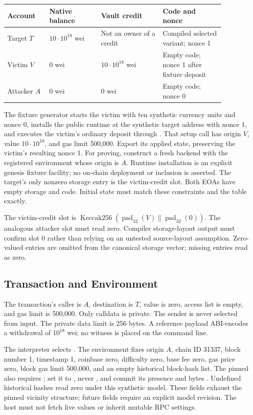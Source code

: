 \documentclass[11pt]{article}
\begin{document}
\begin{longtable}{L{0.17\linewidth}L{0.21\linewidth}L{0.25\linewidth}L{0.25\linewidth}}
\toprule
\textbf{Account} & \textbf{Native balance} & \textbf{Vault credit} & \textbf{Code and nonce} \\
\midrule
\endhead
Target \(T\) & \(10\cdot10^{18}\) wei & Not an owner of a credit & Compiled selected variant; nonce 1 \\
Victim \(V\) & 0 wei & \(10\cdot10^{18}\) wei & Empty code; nonce 1 after fixture deposit \\
Attacker \(A\) & 0 wei & 0 wei & Empty code; nonce 0 \\
\bottomrule
\end{longtable}

The fixture generator starts the victim with ten synthetic currency units and nonce 0, installs the public runtime at the synthetic target address with nonce 1, and executes the victim's ordinary deposit through . That setup call has origin \(V\), value \(10\cdot10^{18}\), and gas limit 500,000. Export its applied state, preserving the victim's resulting nonce 1. For proving, construct a fresh backend with the registered environment whose origin is \(A\). Runtime installation is an explicit genesis fixture facility; no on-chain deployment or inclusion is asserted. The target's only nonzero storage entry is the victim-credit slot. Both EOAs have empty storage and code. Initial state must match these constraints and the table exactly.

The victim-credit slot is \(\operatorname{Keccak256}(\operatorname{pad}_{32}(V)\|\operatorname{pad}_{32}(0))\). The analogous attacker slot must read zero. Compiler storage-layout output must confirm slot 0 rather than relying on an untested source-layout assumption. Zero-valued entries are omitted from the canonical storage vector; missing entries read as zero.

\subsection{Transaction and Environment}
The transaction's caller is \(A\), destination is \(T\), value is zero, access list is empty, and gas limit is 500,000. Only calldata is private. The sender is never selected from input. The private data limit is 256 bytes. A reference payload ABI-encodes a withdrawal of \(10^{18}\) wei; no witness is placed on the command line.

The interpreter selects . The environment fixes origin \(A\), chain ID 31337, block number 1, timestamp 1, coinbase zero, difficulty zero, base fee zero, gas price zero, block gas limit 500,000, and an empty historical block-hash list. The pinned  also requires ; set it to , never , and commit its presence and bytes \cite{evmsource}. Undefined historical hashes read zero under this synthetic model. These fields exhaust the pinned vicinity structure; future fields require an explicit model revision. The host must not fetch live values or inherit mutable RPC settings.
\end{document}
